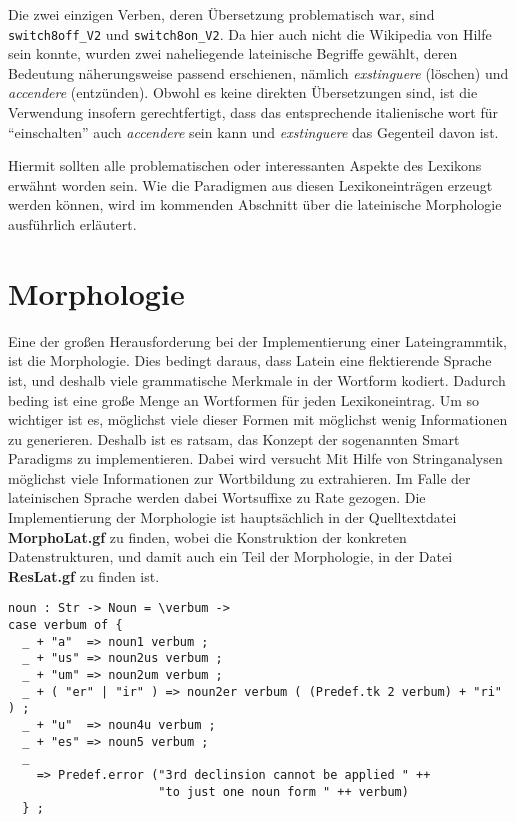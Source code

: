 \documentclass[12pt,abstract=on,titlepage,bibliography=totoc,ngerman,listof=totoc]{scrreprt}
\begin{document}
Die zwei einzigen Verben, deren Übersetzung problematisch war, sind \texttt{switch8off\_V2} und \texttt{switch8on\_V2}. Da hier auch nicht die Wikipedia von Hilfe sein konnte, wurden zwei naheliegende lateinische Begriffe gewählt, deren Bedeutung näherungsweise passend erschienen, nämlich \textit{exstinguere} (löschen) und \textit{accendere} (entzünden). Obwohl es keine direkten Übersetzungen sind, ist die Verwendung insofern gerechtfertigt, dass das entsprechende italienische wort für ``einschalten'' auch \textit{accendere} sein kann und \textit{exstinguere} das Gegenteil davon ist. \par
Hiermit sollten alle problematischen oder interessanten Aspekte des Lexikons erwähnt worden sein. Wie die Paradigmen aus diesen Lexikoneinträgen erzeugt werden können, wird im kommenden Abschnitt über die lateinische Morphologie ausführlich erläutert.
\FloatBarrier
\pagebreak
\section{Morphologie}
\label{sec:morpho}
Eine der großen Herausforderung bei der Implementierung einer Lateingrammtik, ist die Morphologie. Dies bedingt daraus, dass Latein eine flektierende Sprache ist, und deshalb viele grammatische Merkmale in der Wortform kodiert. Dadurch beding ist eine große Menge an Wortformen für jeden Lexikoneintrag. Um so wichtiger ist es, möglichst viele dieser Formen mit möglichst wenig Informationen zu generieren. Deshalb ist es ratsam, das Konzept der sogenannten Smart Paradigms zu implementieren. Dabei wird versucht Mit Hilfe von Stringanalysen möglichst viele Informationen zur Wortbildung zu extrahieren. Im Falle der lateinischen Sprache werden dabei Wortsuffixe zu Rate gezogen. Die Implementierung der Morphologie ist hauptsächlich in der Quelltextdatei \textbf{MorphoLat.gf} zu finden, wobei die Konstruktion der konkreten Datenstrukturen, und damit auch ein Teil der Morphologie, in der Datei \textbf{ResLat.gf} zu finden ist.
\begin{lstlisting}[float=ht,caption={Beispiel für ein Smart Paradigm mit Hilfe von Pattern matching},label={GF-Morpho-Noun}]
noun : Str -> Noun = \verbum -> 
case verbum of {
  _ + "a"  => noun1 verbum ;
  _ + "us" => noun2us verbum ;
  _ + "um" => noun2um verbum ;
  _ + ( "er" | "ir" ) => noun2er verbum ( (Predef.tk 2 verbum) + "ri" ) ;
  _ + "u"  => noun4u verbum ;
  _ + "es" => noun5 verbum ;
  _  
    => Predef.error ("3rd declinsion cannot be applied " ++ 
                     "to just one noun form " ++ verbum)
  } ;
\end{lstlisting}
\end{document}
